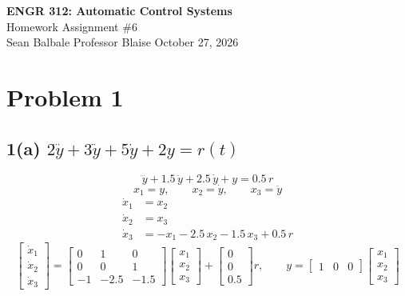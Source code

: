 \documentclass[11pt]{article}
\begin{document}
\begin{center}
{\Large\bfseries ENGR 312: Automatic Control Systems}\\[2pt]
{\large Homework Assignment \#6}\\[4pt]
Sean Balbale \quad\textbullet\quad Professor Blaise \quad\textbullet\quad October 27, 2026
\end{center}

\section*{Problem 1}

\subsection*{1(a) \quad $2\dddot{y} + 3\ddot{y} + 5\dot{y} + 2y = r(t)$}

\[
\dddot{y} + 1.5\,\ddot{y} + 2.5\,\dot{y} + y = 0.5\,r
\]
\[
x_1 = y, \qquad x_2 = \dot{y}, \qquad x_3 = \ddot{y}
\]
\begin{align*}
\dot{x}_1 &= x_2\\
\dot{x}_2 &= x_3\\
\dot{x}_3 &= -x_1 - 2.5\,x_2 - 1.5\,x_3 + 0.5\,r
\end{align*}
\[
\begin{bmatrix}\dot{x}_1\\ \dot{x}_2\\ \dot{x}_3\end{bmatrix}
=
\begin{bmatrix}0 & 1 & 0\\ 0 & 0 & 1\\ -1 & -2.5 & -1.5\end{bmatrix}
\begin{bmatrix}x_1\\ x_2\\ x_3\end{bmatrix}
+
\begin{bmatrix}0\\ 0\\ 0.5\end{bmatrix} r,
\qquad
y = \begin{bmatrix}1 & 0 & 0\end{bmatrix}
\begin{bmatrix}x_1\\ x_2\\ x_3\end{bmatrix}
\]
\end{document}
